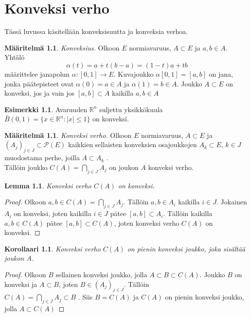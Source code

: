 \documentclass[12pt,a4paper,leqno]{report}
\newcommand{\R}{\mathbb{R}}
\theoremstyle{plain}
\newtheorem{lem}[equation]{Lemma}
\newtheorem{kor}[equation]{Korollaari}
\theoremstyle{definition}
\newtheorem{maar}[equation]{Määritelmä}
\newtheorem{esim}[equation]{Esimerkki}
\theoremstyle{remark}
\begin{document}
\chapter{Konveksi verho}\label{konverho}
Tässä luvussa käsitellään konveksisuutta ja konveksia verhoa.
\begin{maar}%
\emph{Konveksius.}
 Olkoon $E$ normiavaruus, $A\subset E$ ja $a,b\in A$. Yhtälö 
$$\alpha (t)=a+t(b-a)=(1-t)a+tb$$ 
määrittelee janapolun $\alpha \colon [0,1]\rightarrow E$. Kuvajoukko $\alpha [0,1] = [a,b]$ on jana, jonka päätepisteet ovat $\alpha (0)=a\in A$ ja $\alpha (1)=b\in A$. 
Joukko $A\subset E$ on konveksi, jos ja vain jos $[a,b]\subset A$ kaikilla $a,b\in A$ 
\end{maar}
\begin{esim}
Avaruuden $\R ^n$ suljettu yksikkökuula $ \bar B(0,1)= \{x\in \R ^n \colon |x|\leq 1\}$ on konveksi.
\end{esim}
\begin{maar}\emph{Konveksi verho.} Olkoon $E$ normiavaruus, $A\subset E$ ja $(A_j)_{j\in J}\subset \mathcal{P}(E)$ 
kaikkien sellaisten konveksien osajoukkojen $A_k\subset E$, $k\in J$ muodostama perhe, joilla %
$A\subset A_k$%
.\\ Tällöin joukko $C(A)=\bigcap_{j\in J} A_j$ on joukon $A$ konveksi verho. 
\end{maar}
\begin{lem} Konveksi verho $C(A)$ on konveksi.\end{lem} 
\begin{proof} Olkoon $a,b\in C(A)=\bigcap_{j\in J} A_j$. 
Tällöin $a,b\in A_i$ kaikilla $i\in J$. %
Jokainen $A_i$ on konveksi, joten kaikilla $i\in J$ pätee $[a,b]\subset A_i$.
Tällöin kaikilla $a,b\in C(A)$ pätee $[a,b] \subset C(A)$, joten konveksi verho $C(A)$ on konveksi.
\end{proof}
\begin{kor}Konveksi verho $C(A)$ on pienin konveksi joukko, joka sisältää joukon $A$.
\end{kor}
\begin{proof} Olkoon $B$ sellainen konveksi joukko, jolla $A\subset B\subset C(A)$. 
Joukko $B$ on konveksi ja $A\subset B$, joten $B\in (A_j)_{j\in J}$. 
Tällöin\\ $C(A)=\bigcap_{j\in J} A_j\subset B$%
. Siis $B= C(A)$ ja $C(A)$ on pienin konveksi joukko, jolla $A\subset C(A)$
\end{proof}
\end{document}
